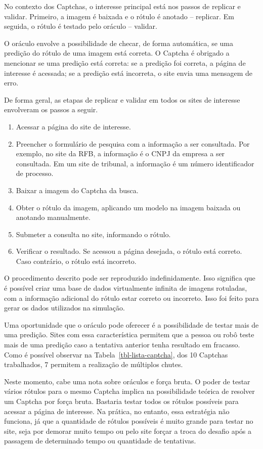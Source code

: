 \documentclass[12pt,twoside,brazilian]{book}
\providecommand{\tightlist}{%
  \setlength{\itemsep}{0pt}\setlength{\parskip}{0pt}}
\begin{document}
No contexto dos Captchas, o interesse principal está nos passos de
replicar e validar. Primeiro, a imagem é baixada e o rótulo é anotado --
replicar. Em seguida, o rótulo é testado pelo oráculo -- validar.

O oráculo envolve a possibilidade de checar, de forma automática, se uma
predição do rótulo de uma imagem está correta. O Captcha é obrigado a
mencionar se uma predição está correta: se a predição foi correta, a
página de interesse é acessada; se a predição está incorreta, o site
envia uma mensagem de erro.

De forma geral, as etapas de replicar e validar em todos os sites de
interesse envolveram os passos a seguir.

\begin{enumerate}
\def\labelenumi{\arabic{enumi}.}
\tightlist
\item
  Acessar a página do site de interesse.
\item
  Preencher o formulário de pesquisa com a informação a ser consultada.
  Por exemplo, no site da RFB, a informação é o CNPJ da empresa a ser
  consultada. Em um site de tribunal, a informação é um número
  identificador de processo.
\item
  Baixar a imagem do Captcha da busca.
\item
  Obter o rótulo da imagem, aplicando um modelo na imagem baixada ou
  anotando manualmente.
\item
  Submeter a consulta no site, informando o rótulo.
\item
  Verificar o resultado. Se acessou a página desejada, o rótulo está
  correto. Caso contrário, o rótulo está incorreto.
\end{enumerate}

O procedimento descrito pode ser reproduzido indefinidamente. Isso
significa que é possível criar uma base de dados virtualmente infinita
de imagens rotuladas, com a informação adicional do rótulo estar correto
ou incorreto. Isso foi feito para gerar os dados utilizados na
simulação.

Uma oportunidade que o oráculo pode oferecer é a possibilidade de testar
mais de uma predição. Sites com essa característica permitem que a
pessoa ou robô teste mais de uma predição caso a tentativa anterior
tenha resultado em fracasso. Como é possível observar na
Tabela~\ref{tbl-lista-captcha}, dos 10 Captchas trabalhados, 7 permitem
a realização de múltiplos chutes.

Neste momento, cabe uma nota sobre oráculos e força bruta. O poder de
testar vários rótulos para o mesmo Captcha implica na possibilidade
teórica de resolver um Captcha por força bruta. Bastaria testar todos os
rótulos possíveis para acessar a página de interesse. Na prática, no
entanto, essa estratégia não funciona, já que a quantidade de rótulos
possíveis é muito grande para testar no site, seja por demorar muito
tempo ou pelo site forçar a troca do desafio após a passagem de
determinado tempo ou quantidade de tentativas.
\end{document}
